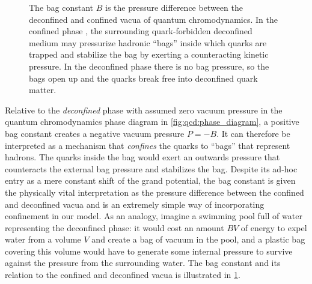 \begin{figure}[t]
{
}
\caption{\label{fig:mit:bag_constant}%
	The bag constant $B$ is the pressure difference between the deconfined and confined vacua of quantum chromodynamics.
	In the confined phase ,
	the surrounding quark-forbidden deconfined medium may pressurize hadronic ``bags''
	inside which quarks are trapped and stabilize the bag by exerting a counteracting kinetic pressure.
	In the deconfined phase  there is no bag pressure,
	so the bags open up and the quarks break free into deconfined quark matter.
}
\end{figure}

Relative to the \emph{deconfined} phase with assumed zero vacuum pressure in the quantum chromodynamics phase diagram in \cref{fig:qcd:phase_diagram},
a positive bag constant creates a negative vacuum pressure $P = -B$.
It can therefore be interpreted as a mechanism that \emph{confines} the quarks to ``bags'' that represent hadrons.
The quarks inside the bag would exert an outwards pressure that counteracts the external bag pressure and stabilizes the bag.
Despite its ad-hoc entry as a mere constant shift of the grand potential,
the bag constant is given the physically vital interpretation as the pressure difference between the confined and deconfined vacua
and is an extremely simple way of incorporating confinement in our model.
As an analogy, imagine a swimming pool full of water representing the deconfined phase:
it would cost an amount $BV$ of energy to expel water from a volume $V$ and create a bag of vacuum in the pool,
and a plastic bag covering this volume would have to generate some internal pressure to survive against the pressure from the surrounding water.
The bag constant and its relation to the confined and deconfined vacua is illustrated in \cref{fig:mit:bag_constant}.

